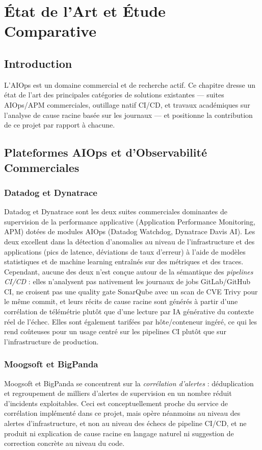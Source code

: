 \documentclass[12pt,a4paper,oneside]{report}
\begin{document}
\chapter{État de l'Art et Étude Comparative}\label{chap:soa}
\section{Introduction}
L'AIOps est un domaine commercial et de recherche actif. Ce chapitre dresse un état de l'art des principales catégories de solutions existantes --- suites AIOps/APM commerciales, outillage natif CI/CD, et travaux académiques sur l'analyse de cause racine basée sur les journaux --- et positionne la contribution de ce projet par rapport à chacune.

\section{Plateformes AIOps et d'Observabilité Commerciales}
\subsection{Datadog et Dynatrace}
Datadog et Dynatrace sont les deux suites commerciales dominantes de supervision de la performance applicative (Application Performance Monitoring, APM) dotées de modules AIOps (Datadog Watchdog, Dynatrace Davis AI). Les deux excellent dans la détection d'anomalies au niveau de l'infrastructure et des applications (pics de latence, déviations de taux d'erreur) à l'aide de modèles statistiques et de machine learning entraînés sur des métriques et des traces. Cependant, aucune des deux n'est conçue autour de la sémantique des \emph{pipelines CI/CD} : elles n'analysent pas nativement les journaux de jobs GitLab/GitHub CI, ne croisent pas une quality gate SonarQube avec un scan de CVE Trivy pour le même commit, et leurs récits de cause racine sont générés à partir d'une corrélation de télémétrie plutôt que d'une lecture par IA générative du contexte réel de l'échec. Elles sont également tarifées par hôte/conteneur ingéré, ce qui les rend coûteuses pour un usage centré sur les pipelines CI plutôt que sur l'infrastructure de production.

\subsection{Moogsoft et BigPanda}
Moogsoft et BigPanda se concentrent sur la \emph{corrélation d'alertes} : déduplication et regroupement de milliers d'alertes de supervision en un nombre réduit d'incidents exploitables. Ceci est conceptuellement proche du service de corrélation implémenté dans ce projet, mais opère néanmoins au niveau des alertes d'infrastructure, et non au niveau des échecs de pipeline CI/CD, et ne produit ni explication de cause racine en langage naturel ni suggestion de correction concrète au niveau du code.
\end{document}
